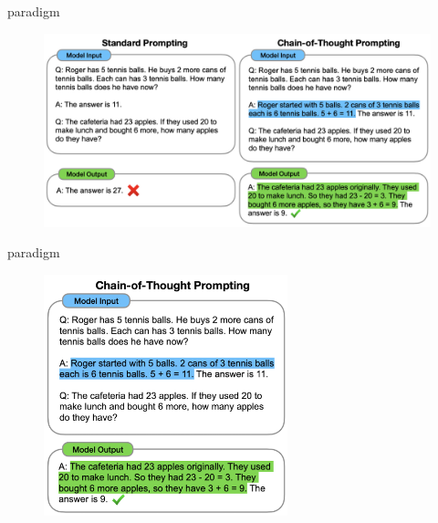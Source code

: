 \begin{vbframe}{\cotpfull paradigm}

\vfill


\begin{figure}
    \centering
    \includegraphics{figure/chain_of_thought.png}\\
\end{figure}

\vfill

\end{vbframe}


\begin{vbframe}{\cotpfull paradigm}

\begin{figure}
    \centering
    \includegraphics[height=7cm]{figure/chain_of_thought2.png}
\end{figure}

\end{vbframe}

